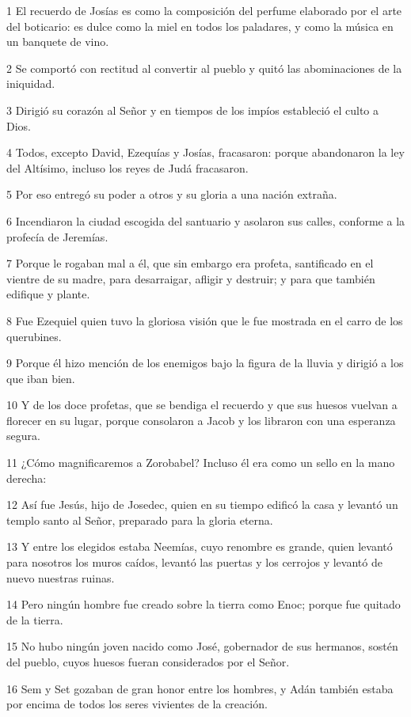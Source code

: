 \par 1 El recuerdo de Josías es como la composición del perfume elaborado por el arte del boticario: es dulce como la miel en todos los paladares, y como la música en un banquete de vino.
\par 2 Se comportó con rectitud al convertir al pueblo y quitó las abominaciones de la iniquidad.
\par 3 Dirigió su corazón al Señor y en tiempos de los impíos estableció el culto a Dios.
\par 4 Todos, excepto David, Ezequías y Josías, fracasaron: porque abandonaron la ley del Altísimo, incluso los reyes de Judá fracasaron.
\par 5 Por eso entregó su poder a otros y su gloria a una nación extraña.
\par 6 Incendiaron la ciudad escogida del santuario y asolaron sus calles, conforme a la profecía de Jeremías.
\par 7 Porque le rogaban mal a él, que sin embargo era profeta, santificado en el vientre de su madre, para desarraigar, afligir y destruir; y para que también edifique y plante.
\par 8 Fue Ezequiel quien tuvo la gloriosa visión que le fue mostrada en el carro de los querubines.
\par 9 Porque él hizo mención de los enemigos bajo la figura de la lluvia y dirigió a los que iban bien.
\par 10 Y de los doce profetas, que se bendiga el recuerdo y que sus huesos vuelvan a florecer en su lugar, porque consolaron a Jacob y los libraron con una esperanza segura.
\par 11 ¿Cómo magnificaremos a Zorobabel? Incluso él era como un sello en la mano derecha:
\par 12 Así fue Jesús, hijo de Josedec, quien en su tiempo edificó la casa y levantó un templo santo al Señor, preparado para la gloria eterna.
\par 13 Y entre los elegidos estaba Neemías, cuyo renombre es grande, quien levantó para nosotros los muros caídos, levantó las puertas y los cerrojos y levantó de nuevo nuestras ruinas.
\par 14 Pero ningún hombre fue creado sobre la tierra como Enoc; porque fue quitado de la tierra.
\par 15 No hubo ningún joven nacido como José, gobernador de sus hermanos, sostén del pueblo, cuyos huesos fueran considerados por el Señor.
\par 16 Sem y Set gozaban de gran honor entre los hombres, y Adán también estaba por encima de todos los seres vivientes de la creación.

